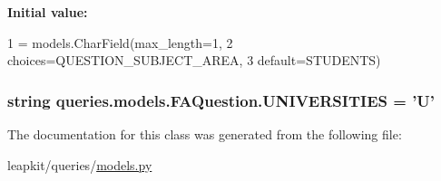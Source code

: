{\bfseries Initial value\-:}
\begin{DoxyCode}
1 = models.CharField(max\_length=1,
2                                choices=QUESTION\_SUBJECT\_AREA,
3                                default=STUDENTS)
\end{DoxyCode}
\hypertarget{classqueries_1_1models_1_1_f_a_question_a48154d9af078c02edb17e3c9ce2f92bc}{
\subsubsection[{U\-N\-I\-V\-E\-R\-S\-I\-T\-I\-E\-S}]{\setlength{\rightskip}{0pt plus 5cm}string queries.\-models.\-F\-A\-Question.\-U\-N\-I\-V\-E\-R\-S\-I\-T\-I\-E\-S = 'U'\hspace{0.3cm}{\ttfamily [static]}}}\label{classqueries_1_1models_1_1_f_a_question_a48154d9af078c02edb17e3c9ce2f92bc}


The documentation for this class was generated from the following file\-:\begin{DoxyCompactItemize}
\item 
leapkit/queries/\hyperlink{queries_2models_8py}{models.\-py}\end{DoxyCompactItemize}
